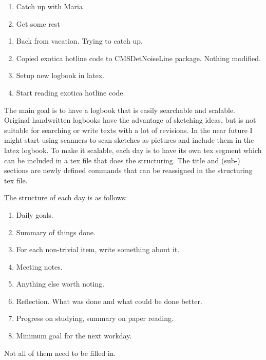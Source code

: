 

\begin{enumerate}
\item Catch up with Maria
\item Get some rest
\end{enumerate}


\begin{enumerate}
\item Back from vacation.  Trying to catch up.
\item Copied exotica hotline code to CMSDetNoiseLine package.  Nothing modified.
\item Setup new logbook in latex.
\item Start reading exotica hotline code.
\end{enumerate}


The main goal is to have a logbook that is easily searchable and scalable.
Original handwritten logbooks have the advantage of sketching ideas, but
is not suitable for searching or write texts with a lot of revisions.
In the near future I might start using scanners to scan sketches as pictures
and include them in the latex logbook.  To make it scalable, each day
is to have its own tex segment which can be included in a tex file that
does the structuring.  The title and (sub-) sections are newly defined
commands that can be reassigned in the structuring tex file.

The structure of each day is as follows:

\begin{enumerate}
\item Daily goals.
\item Summary of things done.
\item For each non-trivial item, write something about it.
\item Meeting notes.
\item Anything else worth noting.
\item Reflection.  What was done and what could be done better.
\item Progress on studying, summary on paper reading.
\item Minimum goal for the next workday.
\end{enumerate}

Not all of them need to be filled in.

